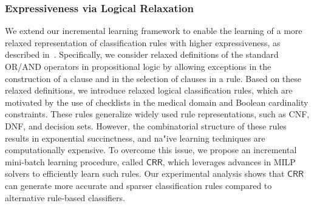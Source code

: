 \documentclass[10pt]{article}
\newcommand{\red}[1]{\textcolor{red}{#1}}
\begin{document}
	\subsubsection*{Expressiveness via Logical Relaxation}
	We extend our incremental learning framework to enable the learning of a more relaxed representation of classification rules with higher expressiveness, as described in~\cite{ghosh2020classification}. Specifically, we consider relaxed definitions of the standard OR/AND operators in propositional logic by allowing exceptions in the construction of a clause and in the selection of clauses in a rule. Based on these relaxed definitions, we introduce relaxed logical classification rules, which are motivated by the use of checklists in the medical domain and Boolean cardinality constraints. These rules generalize widely used rule representations, such as CNF, DNF, and decision sets. However, the combinatorial structure of these rules results in exponential succinctness, and na"ive learning techniques are computationally expensive. To overcome this issue, we propose an incremental mini-batch learning procedure, called $\mathsf{CRR}$, which leverages advances in MILP solvers to efficiently learn such rules. Our experimental analysis shows that $\mathsf{CRR}$ can generate more accurate and sparser classification rules compared to alternative rule-based classifiers.
	
	
	
	
	
\end{document}
